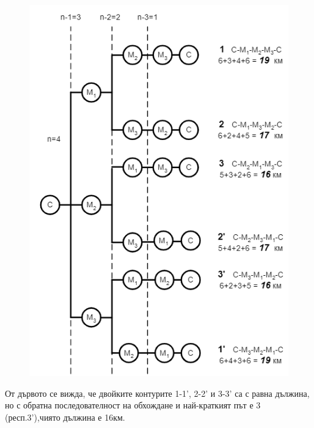 \documentclass[fleqn, 12pt]{article}
\theoremstyle{definition}
\begin{document}
\begin{figure} [htp!]
\includegraphics{Pics/Discrete math/ex8/ex8-task6-1.png}
\end{figure}
От дървото се вижда, че двойките контурите 1-1’,  2-2’ и 3-3’ са с равна дължина, но с обратна последователност на обхождане и най-краткият път е 3 (респ.3’),чиято дължина е 16км.
\end{document}
